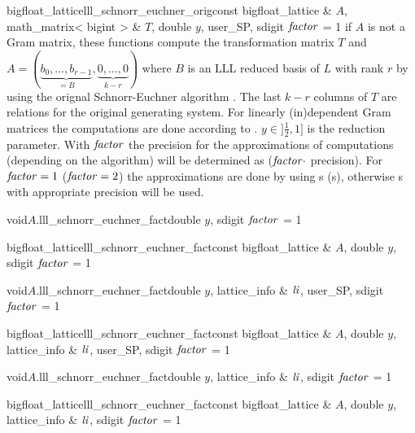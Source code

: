 \begin{fcode}{bigfloat_lattice}{lll_schnorr_euchner_orig}{const bigfloat_lattice & $A$,
    math_matrix< bigint > & $T$, double $y$, user_SP, sdigit $\mathit{factor}$ = 1}%
  if $A$ is not a Gram matrix, these functions compute the transformation matrix $T$ and $A =
  (\underbrace{b_0, \dots, b_{r-1}}_{=B},\underbrace{0, \dots, 0}_{k-r})$ where $B$ is an LLL
  reduced basis of $L$ with rank $r$ by using the orignal Schnorr-Euchner algorithm
  \cite{Schnorr/Euchner:1994}.  The last $k-r$ columns of $T$ are relations for the original
  generating system.  For linearly (in)dependent Gram matrices the computations are done
  according to \cite{Cohen:1995}.  $y\in ]\frac{1}{2},1]$ is the reduction parameter.  With
  $\mathit{factor}$ the precision for the approximations of computations (depending on the algorithm)
  will be determined as ($\mathit{factor} \cdot$  precision).  For $\mathit{factor} = 1$ ($\mathit{factor}
  = 2$) the approximations are done by using s (s), otherwise
  s with appropriate precision will be used.
\end{fcode}



\begin{fcode}{void}{$A$.lll_schnorr_euchner_fact}{double $y$, sdigit $\mathit{factor}$ = 1}
\end{fcode}

\begin{fcode}{bigfloat_lattice}{lll_schnorr_euchner_fact}{const bigfloat_lattice & $A$,
    double $y$, sdigit $\mathit{factor}$ = 1}%
\end{fcode}

\begin{fcode}{void}{$A$.lll_schnorr_euchner_fact}{double $y$, lattice_info & $\mathit{li}$, user_SP,
    sdigit $\mathit{factor}$ = 1}%
\end{fcode}

\begin{fcode}{bigfloat_lattice}{lll_schnorr_euchner_fact}{const bigfloat_lattice & $A$,
    double $y$, lattice_info & $\mathit{li}$, user_SP, sdigit $\mathit{factor}$ = 1}%
\end{fcode}

\begin{fcode}{void}{$A$.lll_schnorr_euchner_fact}{double $y$, lattice_info & $\mathit{li}$,
    sdigit $\mathit{factor}$ = 1}%
\end{fcode}

\begin{fcode}{bigfloat_lattice}{lll_schnorr_euchner_fact}{const bigfloat_lattice & $A$,
    double $y$, lattice_info & $\mathit{li}$, sdigit $\mathit{factor}$ = 1}%
\end{fcode}

